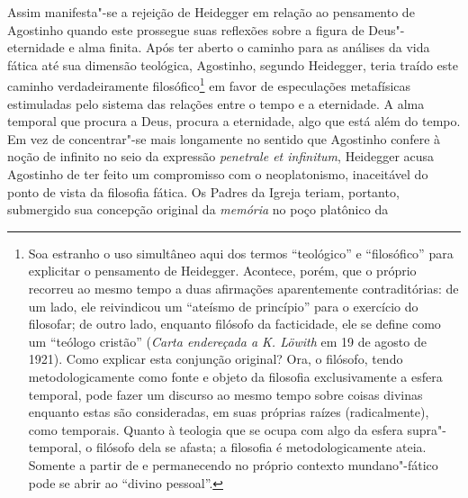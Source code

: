 Assim manifesta"-se a rejeição de Heidegger em relação ao
pensamento de Agostinho quando este prossegue suas reflexões
sobre a figura de Deus"-eternidade e alma finita. Após ter aberto
o caminho para as análises da vida fática até sua dimensão
teológica, Agostinho, segundo Heidegger, teria traído este
caminho verdadeiramente filosófico\footnote{   Soa estranho
o uso simultâneo aqui dos termos “teológico” e “filosófico” para
explicitar o pensamento de Heidegger. Acontece, porém, que o
próprio recorreu ao mesmo tempo a duas afirmações aparentemente
contraditórias: de um lado, ele reivindicou um “ateísmo de
princípio” para o exercício do filosofar; de outro lado,
enquanto filósofo da facticidade, ele se define como um “teólogo
cristão” (\emph{Carta endereçada a K. Löwith} em 19 de agosto
de 1921). Como explicar esta conjunção original? Ora, o
filósofo, tendo metodologicamente como fonte e objeto da
filosofia exclusivamente a esfera temporal, pode fazer um
discurso ao mesmo tempo sobre coisas divinas enquanto estas são
consideradas, em suas próprias raízes (radicalmente), como
temporais. Quanto à teologia que se ocupa com algo da esfera
supra"-temporal, o filósofo dela se afasta; a filosofia é
metodologicamente ateia. Somente a partir de e permanecendo no
próprio contexto mundano"-fático pode se abrir ao “divino
pessoal”.}  em favor de especulações metafísicas
estimuladas pelo sistema das relações entre o tempo e a
eternidade. A alma temporal que procura a Deus, procura a
eternidade, algo que está além do tempo. Em vez de concentrar"-se
mais longamente no sentido que Agostinho confere à noção de
infinito no seio da expressão \emph{penetrale et infinitum},
Heidegger acusa Agostinho de ter feito um compromisso com o
neoplatonismo, inaceitável do ponto de vista da filosofia
fática. Os Padres da Igreja teriam, portanto, submergido sua
concepção original da \emph{memória} no poço platônico da
